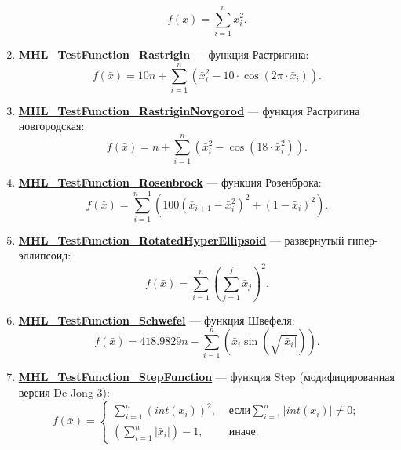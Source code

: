 \begin{enumerate}
 \begin{equation}
 f\left( \bar{x}\right) = \sum_{i=1}^{n}\bar{x}_i^2.
 \end{equation}
 \item \hyperref[TestFunctions:section:MHL_TestFunction_Rastrigin]{\textbf{MHL\_TestFunction\_Rastrigin}} --- функция Растригина:
 \begin{equation}
 f\left( \bar{x}\right) = 10n+\sum_{i=1}^{n}\left( \bar{x}_i^2-10\cdot\cos\left( 2\pi\cdot \bar{x}_i\right) \right).
 \end{equation}
 \item \hyperref[TestFunctions:section:MHL_TestFunction_RastriginNovgorod]{\textbf{MHL\_TestFunction\_RastriginNovgorod}} --- функция Растригина новгородская:
 \begin{equation}
 f\left( \bar{x}\right) = n+\sum_{i=1}^{n}\left( \bar{x}_i^2-\cos\left(18\cdot \bar{x}_i^2\right) \right).
 \end{equation}
 \item \hyperref[TestFunctions:section:MHL_TestFunction_Rosenbrock]{\textbf{MHL\_TestFunction\_Rosenbrock}} --- функция Розенброка:
 \begin{equation}
 f\left( \bar{x}\right) = \sum_{i=1}^{n-1} \left( 100{\left( \bar{x}_{i+1}-\bar{x}_i^2\right)}^2+{\left( 1-\bar{x}_i\right) }^2 \right).
 \end{equation}
 \item \hyperref[TestFunctions:section:MHL_TestFunction_RotatedHyperEllipsoid]{\textbf{MHL\_TestFunction\_RotatedHyperEllipsoid}} --- развернутый гипер-эллипсоид:
 \begin{equation}
 f\left( \bar{x}\right) = \sum_{i=1}^{n}\left( \sum_{j=1}^{j}\bar{x}_j\right) ^2.
 \end{equation}
 \item \hyperref[TestFunctions:section:MHL_TestFunction_Schwefel]{\textbf{MHL\_TestFunction\_Schwefel}} --- функция Швефеля:
 \begin{equation}
 f\left( \bar{x}\right) = 418.9829 n-\sum_{i=1}^{n}\left( \bar{x}_i\sin\left( \sqrt{\left| \bar{x}_i\right|}\right)  \right).
 \end{equation}
 \item \hyperref[TestFunctions:section:MHL_TestFunction_StepFunction]{\textbf{MHL\_TestFunction\_StepFunction}} --- функция Step (модифицированная версия De Jong 3):
 \begin{equation}
 f\left( \bar{x}\right) =\left\lbrace \begin{aligned}
 \sum_{i=1}^{n} \left( int\left( \bar{x}_{i}\right)  \right)^2,& \text{ если} \sum_{i=1}^{n} \left| int\left( \bar{x}_{i}\right)\right| \neq 0 ;\\ \left( \sum_{i=1}^{n} \left| \bar{x}_{i}\right|\right) -1 ,& \text{ иначе}.

\end{aligned}
\end{equation}
\end{enumerate}
